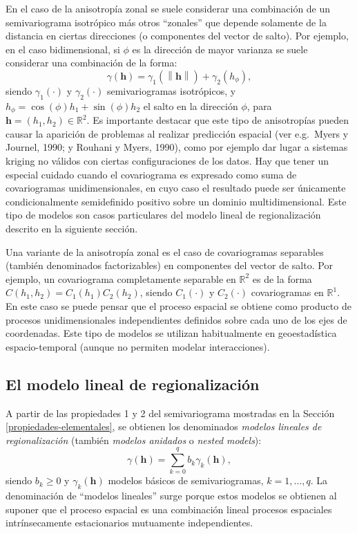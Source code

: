 \documentclass[
]{book}
\theoremstyle{break}
\theoremstyle{definition}
\theoremstyle{definition}
\theoremstyle{definition}
\theoremstyle{definition}
\theoremstyle{remark}
\begin{document}
En el caso de la anisotropía zonal se suele considerar una combinación de un semivariograma isotrópico más otros ``zonales'' que depende solamente de la distancia en ciertas direcciones (o componentes del vector de salto).
Por ejemplo, en el caso bidimensional, si \(\phi\) es la dirección de mayor varianza se suele considerar una combinación de la forma:
\[\gamma(\mathbf{h})=\gamma_1 (\left\| \mathbf{h}\right\|)+\gamma_2(h_{\phi }),\]
siendo \(\gamma_1 (\cdot)\) y \(\gamma_2 (\cdot)\) semivariogramas isotrópicos, y \(h_{\phi } =\cos (\phi)h_1 +\sin(\phi)h_2\) el salto en la dirección \(\phi\), para \(\mathbf{h}=(h_1 ,h_2)\in \mathbb{R} ^{2}\).
Es importante destacar que este tipo de anisotropías pueden causar la aparición de problemas al realizar predicción espacial (ver e.g.~Myers y Journel, 1990; y Rouhani y Myers, 1990), como por ejemplo dar lugar a sistemas kriging no válidos con ciertas configuraciones de los datos.
Hay que tener un especial cuidado cuando el covariograma es expresado como suma de covariogramas unidimensionales, en cuyo caso el resultado puede ser únicamente condicionalmente semidefinido positivo sobre un dominio multidimensional.
Este tipo de modelos son casos particulares del modelo lineal de regionalización descrito en la siguiente sección.

Una variante de la anisotropía zonal es el caso de covariogramas separables (también denominados factorizables) en componentes del vector de salto.
Por ejemplo, un covariograma completamente separable en \(\mathbb{R}^2\) es de la forma \(C(h_1, h_2)= C_1(h_1)C_2(h_2)\), siendo \(C_1(\cdot)\) y \(C_2(\cdot)\) covariogramas en \(\mathbb{R}^{1}\).
En este caso se puede pensar que el proceso espacial se obtiene como producto de procesos unidimensionales independientes definidos sobre cada uno de los ejes de coordenadas.
Este tipo de modelos se utilizan habitualmente en geoestadística espacio-temporal (aunque no permiten modelar interacciones).

\subsection{El modelo lineal de regionalización}\label{vario-lin-reg}

A partir de las propiedades 1 y 2 del semivariograma mostradas en la Sección \ref{propiedades-elementales}, se obtienen los denominados \emph{modelos lineales de regionalización} (también \emph{modelos anidados} o \emph{nested models}):
\[\gamma(\mathbf{h}) = \sum\limits_{k=0}^{q}b_{k} \gamma_{k}(\mathbf{h}),\]
siendo \(b_k \ge 0\) y \(\gamma_{k}(\mathbf{h})\) modelos básicos de semivariogramas, \(k=1, \ldots, q\).
La denominación de ``modelos lineales'' surge porque estos modelos se obtienen al suponer que el proceso espacial es una combinación lineal procesos espaciales intrínsecamente estacionarios mutuamente independientes.
\end{document}
